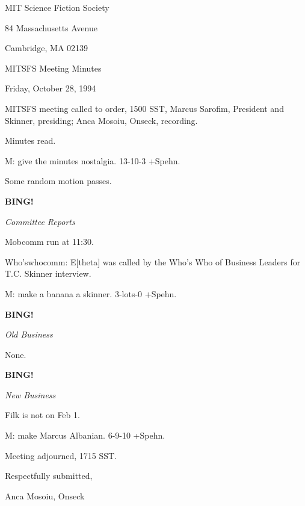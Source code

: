 \documentclass[12pt]{article}
\newcommand{\bing}{{\bf BING!} }
\newcommand{\goto}[1]{\bing \vskip 12pt \centerline{{\em{#1}}}}
\begin{document}
\begin{center}

MIT Science Fiction Society 

84 Massachusetts Avenue

Cambridge, MA 02139

\vspace{12pt}

MITSFS Meeting Minutes 

Friday, October 28, 1994

\end{center}
 
\vspace{18pt}

\setlength{\parskip}{6pt}

\noindent
MITSFS meeting called to order, 1500 SST,
Marcus Sarofim, President and Skinner, presiding; Anca Mosoiu, Onseck, recording.

Minutes read.

M: give the minutes nostalgia. 13-10-3 +Spehn.

Some random motion passes.

\goto{Committee Reports}

Mobcomm run at 11:30.

Who'swhocomm: E[theta] was called by the Who's Who of Business Leaders for T.C. Skinner interview.

M: make a banana a skinner. 3-lots-0 +Spehn.

\goto{Old Business}

None.

\goto{New Business}

Filk is not on Feb 1.

M: make Marcus Albanian. 6-9-10 +Spehn.

\vspace{12pt}

\noindent
Meeting adjourned, 1715 SST.

\vspace{18pt}

\centerline{Respectfully submitted,}
\centerline{Anca Mosoiu, Onseck}
\end{document}
